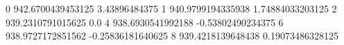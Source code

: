 0 942.6700439453125 3.43896484375
1 940.9799194335938 1.74884033203125
2 939.2310791015625 0.0
4 938.6930541992188 -0.53802490234375
6 938.9727172851562 -0.25836181640625
8 939.4218139648438 0.19073486328125
